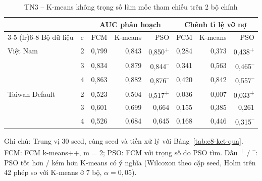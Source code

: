 \begin{table}[htbp]
\centering
\caption{TN3 -- K-means không trọng số làm mốc tham chiếu trên 2 bộ chính}
\label{tab:e8-kmeans}
\footnotesize
\setlength{\tabcolsep}{3pt}
\begin{tabular}{@{}llrrrrrr@{}}
\toprule
& & \multicolumn{3}{c}{AUC phân hoạch} & \multicolumn{3}{c}{Chênh tỉ lệ vỡ nợ} \\
\cmidrule(lr){3-5} \cmidrule(lr){6-8}
Bộ dữ liệu & c & FCM & K-means & PSO & FCM & K-means & PSO \\
\midrule
Việt Nam & 2 & 0,799 & 0,843 & 0,850\textsuperscript{+} & 0,284 & 0,373 & 0,438\textsuperscript{+} \\
 & 3 & 0,834 & 0,879 & 0,844\textsuperscript{--} & 0,341 & 0,563 & 0,465\textsuperscript{--} \\
 & 4 & 0,863 & 0,882 & 0,876\textsuperscript{--} & 0,420 & 0,842 & 0,557\textsuperscript{--} \\
\midrule
Taiwan Default & 2 & 0,523 & 0,504 & 0,517\textsuperscript{+} & 0,036 & 0,007 & 0,033\textsuperscript{+} \\
 & 3 & 0,601 & 0,699 & 0,664 & 0,155 & 0,385 & 0,261 \\
 & 4 & 0,526 & 0,684 & 0,645 & 0,168 & 0,446 & 0,315\textsuperscript{--} \\
\bottomrule
\end{tabular}
\par\smallskip\parbox{\linewidth}{\scriptsize Ghi chú: Trung vị 30 seed, cùng seed và tiền xử lý với Bảng~\ref{tab:e8-ket-qua}. FCM: FCM k-means++, m = 2; PSO: FCM với trọng số do PSO tìm. Dấu \textsuperscript{+} / \textsuperscript{--}: PSO tốt hơn / kém hơn K-means có ý nghĩa (Wilcoxon theo cặp seed, Holm trên 42 phép so với K-means ở 7 bộ, $\alpha = 0{,}05$).}
\end{table}
